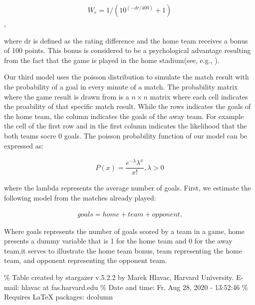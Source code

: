 \documentclass[12pt,a4paper]{article}
\begin{document}
\begin{align}
W_e = 1/(10^{(-dr/400)}+1)
\end{align},

where dr is defined as the rating difference and the home team receives
a bonus of 100 points. This bonus is considered to be a psychological
advantage resulting from the fact that the game is played in the home
stadium(see, e.g., \textcite{Pollard2008}).

Our third model uses the poisson distribution to simulate the match
result with the probability of a goal in every minute of a match. The
probability matrix where the game result is drawn from is a
\(n \times n\) matrix where each cell indicates the proability of that
specific match result. While the rows indicates the goals of the home
team, the column indicates the goals of the away team. For example the
cell of the first row and in the first column indicates the likelihood
that the both teams socre \(0\) goals. The poisson probability function
of our model can be expressed as:

\begin{align}
P(x) = \dfrac{e^{-\lambda}\lambda^x}{x!}, \lambda > 0
\end{align}

where the lambda represents the average number of goals. First, we
estimate the following model from the matches already played:

\begin{align}
goals = home + team + opponent . 
\end{align}

Where goals represents the number of goals scored by a team in a game,
home presents a dummy variable that is 1 for the home team and 0 for the
away team,it serves to illustrate the home team bonus, team representing
the home team, and opponent representing the opponent team.

\% Table created by stargazer v.5.2.2 by Marek Hlavac, Harvard
University. E-mail: hlavac at fas.harvard.edu \% Date and time: Fr, Aug
28, 2020 - 13:52:46 \% Requires LaTeX packages: dcolumn
\end{document}
